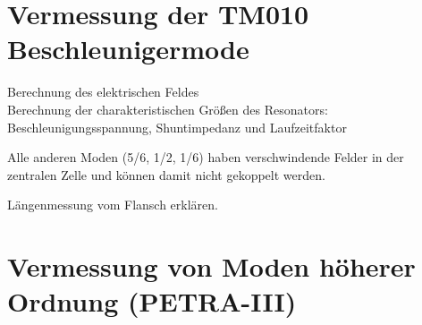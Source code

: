 \section{Vermessung der TM010 Beschleunigermode}
Berechnung des elektrischen Feldes\\
Berechnung der charakteristischen Größen des Resonators: Beschleunigungsspannung, Shuntimpedanz und Laufzeitfaktor

Alle anderen Moden (5/6, 1/2, 1/6) haben verschwindende Felder in der zentralen Zelle und können damit nicht gekoppelt werden.

Längenmessung vom Flansch erklären.


\section{Vermessung von Moden höherer Ordnung (PETRA-III)}
